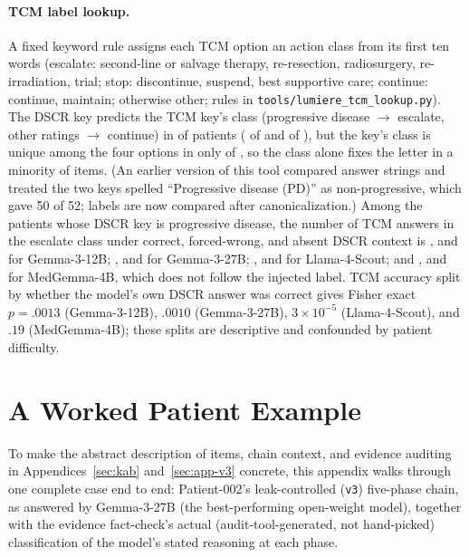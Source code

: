 \documentclass[11pt]{article}
\begin{document}
\paragraph{TCM label lookup.} A fixed keyword rule assigns each TCM option an action class from its first ten words (escalate: second-line or salvage therapy, re-resection, radiosurgery, re-irradiation, trial; stop: discontinue, suspend, best supportive care; continue: continue, maintain; otherwise other; rules in \texttt{tools/lumiere\_tcm\_lookup.py}). The DSCR key predicts the TCM key\textquoteright s class (progressive disease $\to$ escalate, other ratings $\to$ continue) in \tcmAgree{} of \tcmN{} patients (\tcmPdEsc{} of \tcmPdN{} and \tcmNonCont{} of \tcmNonN{}), but the key\textquoteright s class is unique among the four options in only \tcmClassUnique{} of \tcmN{}, so the class alone fixes the letter in a minority of items. (An earlier version of this tool compared answer strings and treated the two keys spelled ``Progressive disease (PD)'' as non-progressive, which gave 50 of 52; labels are now compared after canonicalization.) Among the \tcmPdN{} patients whose DSCR key is progressive disease, the number of TCM answers in the escalate class under correct, forced-wrong, and absent DSCR context is \tcmFollowCorrectGemmaTwelve{}, \tcmFollowIncorrectGemmaTwelve{} and \tcmFollowAbsentGemmaTwelve{} for Gemma-3-12B; \tcmFollowCorrectGemmaTwentySeven{}, \tcmFollowIncorrectGemmaTwentySeven{} and \tcmFollowAbsentGemmaTwentySeven{} for Gemma-3-27B; \tcmFollowCorrectScout{}, \tcmFollowIncorrectScout{} and \tcmFollowAbsentScout{} for Llama-4-Scout; and \tcmFollowCorrectMedGemma{}, \tcmFollowIncorrectMedGemma{} and \tcmFollowAbsentMedGemma{} for MedGemma-4B, which does not follow the injected label. TCM accuracy split by whether the model\textquoteright s own DSCR answer was correct gives Fisher exact $p=.0013$ (Gemma-3-12B), $.0010$ (Gemma-3-27B), $3\times10^{-5}$ (Llama-4-Scout), and $.19$ (MedGemma-4B); these splits are descriptive and confounded by patient difficulty.


\section{A Worked Patient Example}
\label{sec:worked-example}

To make the abstract description of items, chain context, and evidence auditing in Appendices~\ref{sec:kab} and~\ref{sec:app-v3} concrete, this appendix walks through one complete case end to end: Patient-002's leak-controlled (\texttt{v3}) five-phase chain, as answered by Gemma-3-27B (the best-performing open-weight model), together with the evidence fact-check's actual (audit-tool-generated, not hand-picked) classification of the model's stated reasoning at each phase.
\end{document}

